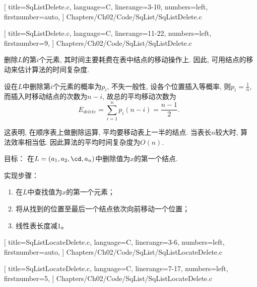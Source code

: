 \begin{frame}[fragile]

[
title=SqListDelete.c,
language=C,
linerange={3-10},
numbers=left,
firstnumber=auto,
]
{Chapters/Ch02/Code/SqList/SqListDelete.c}
\end{frame}

\begin{frame}[fragile]

[
title=SqListDelete.c,
language=C,
linerange={11-22},
numbers=left,
firstnumber=9,
]
{Chapters/Ch02/Code/SqList/SqListDelete.c}
\end{frame}
%
%
\begin{frame} 
删除$L$的第$i$个元素,  其时间主要耗费在表中结点的移动操作上. 因此,  可用结点的移动来估计算法的时间复杂度. \vspace{0.1in}

设在$L$中删除第$i$个元素的概率为$p_i$,  不失一般性,  设各个位置插入等概率,  则$p_i=\frac1{n}$,  而插入时移动结点的次数为$n-i$,  故总的平均移动次数为
$$
E_{delete}=\sum_{i=1}^n p_i (n-i)=\frac {n-1}2.
$$

这表明,  在顺序表上做删除运算,  平均要移动表上一半的结点. 当表长$n$较大时,  算法效率相当低. 因此算法的平均时间复杂度为$O(n)$. 
\end{frame}

\begin{frame}
\textcolor{acolor5}{目标：}
在$L=(a_1,a_2,\cd,a_n)$中删除值为$x$的第一个结点. 

\pause 
\textcolor{acolor5}{实现步骤：}
\begin{enumerate}
\item 
在$L$中查找值为$x$的第一个元素；
\item 
将从找到的位置至最后一个结点依次向前移动一个位置；
\item 
线性表长度减$1$。 
\end{enumerate}
\end{frame}


\begin{frame}[fragile]

[
title=SqListLocateDelete.c,
language=C,
linerange={3-6},
numbers=left,
firstnumber=auto,
]
{Chapters/Ch02/Code/SqList/SqListLocateDelete.c}
\end{frame}

\begin{frame}[fragile]

[
title=SqListLocateDelete.c,
language=C,
linerange={7-17},
numbers=left,
firstnumber=5,
]
{Chapters/Ch02/Code/SqList/SqListLocateDelete.c}
\end{frame}

